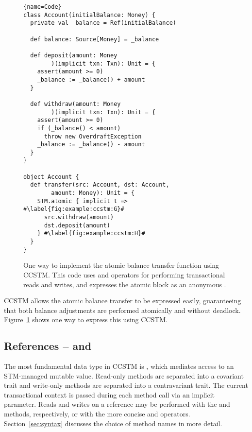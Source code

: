 \begin{figure}
\begin{lstlisting}{name=Code}
class Account(initialBalance: Money) {
  private val _balance = Ref(initialBalance)

  def balance: Source[Money] = _balance

  def deposit(amount: Money
        )(implicit txn: Txn): Unit = {
    assert(amount >= 0)
    _balance := _balance() + amount
  }

  def withdraw(amount: Money
        )(implicit txn: Txn): Unit = {
    assert(amount >= 0)
    if (_balance() < amount)
      throw new OverdraftException
    _balance := _balance() - amount
  }
}

object Account {
  def transfer(src: Account, dst: Account,
        amount: Money): Unit = {
    STM.atomic { implicit t => #\label{fig:example:ccstm:G}#
      src.withdraw(amount)
      dst.deposit(amount)
    } #\label{fig:example:ccstm:H}#
  }
}
\end{lstlisting}

\caption{One way to implement the atomic balance transfer function
using CCSTM.  This code uses  and \code{:=} operators
for performing transactional reads and writes, and expresses the atomic
block as an anonymous .}

\label{fig:example:ccstm}
\end{figure}

CCSTM allows the atomic balance transfer to be expressed easily,
guaranteeing that both balance adjustments are performed atomically and
without deadlock.  Figure~\ref{fig:example:ccstm} shows one way to
express this using CCSTM.

\subsection{References --  and }

The most fundamental data type in CCSTM is , which mediates
access to an STM-managed mutable value.  Read-only methods are separated into a
covariant  trait and write-only methods are separated into a
contravariant  trait.  The current transactional context is passed
during
each method call via an implicit parameter.  Reads and writes on a
reference may be performed with the  and  methods,
respectively, or with the more concise  and \code{:=}
operators.  Section~\ref{sec:syntax} discusses
the choice of method names in more detail.

